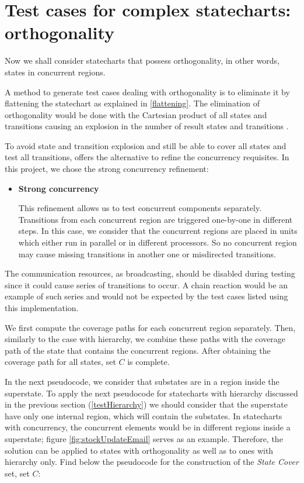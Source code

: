 \section{Test cases for complex statecharts: orthogonality}
\label{testOrthogonality}

Now we shall consider statecharts that possess orthogonality, in other words, states in concurrent regions.

A method to generate test cases dealing with orthogonality is to eliminate it by flattening the statechart as explained in \ref{flattening}. The elimination of orthogonality would be done with the Cartesian product of all states and transitions causing an explosion in the number of result states and transitions \cite{bogdanov}.

To avoid state and transition explosion and still be able to cover all states and test all transitions, \cite{bogdanov} offers the alternative to refine the concurrency requisites. In this project, we chose the strong concurrency refinement:

\begin{itemize}

\item \textbf{Strong concurrency}

This refinement allows us to test concurrent components separately. Transitions from each concurrent region are triggered one-by-one in different steps. In this case, we consider that the concurrent regions are placed in units which either run in parallel or in different processors. So no concurrent region may cause missing transitions in another one or misdirected transitions.
\end{itemize}

The communication resources, as broadcasting, should be disabled during testing since it could cause series of transitions to occur. A chain reaction would be an example of such series and would not be expected by the test cases listed using this implementation.

We first compute the coverage paths for each concurrent region separately. Then, similarly to the case with hierarchy, we combine these paths with the coverage path of the state that contains the concurrent regions. After obtaining the coverage path for all states, set $C$ is complete. 

In the next pseudocode, we consider that substates are in a region inside the superstate. To apply the next pseudocode for statecharts with hierarchy discussed in the previous section (\ref{testHierarchy}) we should consider that the superstate have only one internal region, which will contain the substates. In statecharts with concurrency, the concurrent elements would be in different regions inside a superstate; figure \ref{fig:stockUpdateEmail} serves as an example. Therefore, the solution can be applied to states with orthogonality as well as to ones with hierarchy only. Find below the pseudocode for the construction of the \textit{State Cover} set, set $C$:

